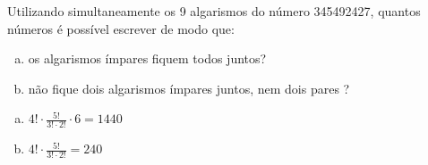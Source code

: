 \begin{ex}
 Utilizando simultaneamente os 9 algarismos do número 345492427, quantos números é possível escrever de modo que:
    \begin{enumerate}[(a)]
    \item os algarismos ímpares fiquem todos juntos?
    \item não fique dois algarismos ímpares juntos, nem dois pares ?
    \end{enumerate}
       \begin{sol}
           \phantom{A} 
         \begin{enumerate} [(a)]
             \item $4!\cdot\frac{5!}{3!\cdot2!}\cdot6=1440$
       
       
       
             \item  $4!\cdot\frac{5!}{3!\cdot2!}=240$
                  
       
         \end{enumerate}
       \end{sol}
\end{ex}